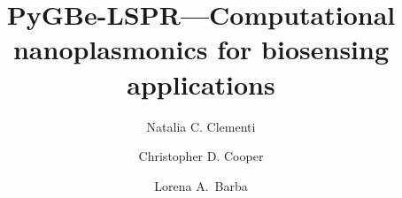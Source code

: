 \documentclass[final,5p,times,twocolumn]{elsarticle}
\begin{document}
\begin{frontmatter}



\title{PyGBe-LSPR---Computational nanoplasmonics for biosensing applications}

\author[gwu]{Natalia C. Clementi}

\author[usm]{Christopher D. Cooper}

\author[gwu]{Lorena A.~Barba}


\address[gwu]{Department of Mechanical \& Aerospace Engineering, The George Washington University, Washington, D.C.}
\address[usm]{Department of Mechanical Engineering and Centro Cient\'ifico Tecnol\'ogico de Valpara\'iso, Universidad T\'ecnica Federico Santa Mar\'ia, Valpara\'iso, Chile.}


\begin{abstract}


\end{abstract}
\end{frontmatter}
\end{document}
